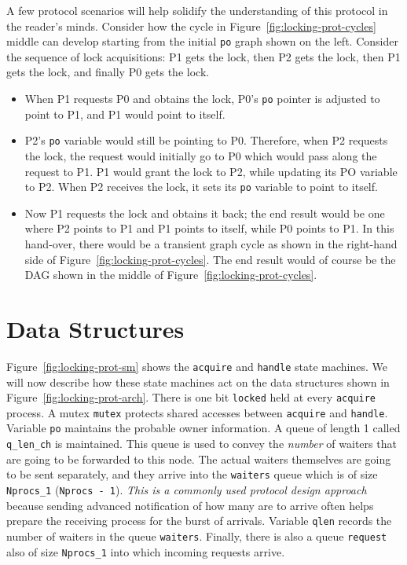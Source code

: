 \documentclass[11pt]{article}
\begin{document}
A few protocol scenarios will help solidify the understanding of
this protocol
in the reader's minds.
%
Consider how the cycle in Figure~\ref{fig:locking-prot-cycles} middle
can develop starting from the initial {\tt po} graph shown on the left.
%
Consider the sequence of lock acquisitions: P1 gets the lock, then P2
gets the lock, then P1 gets the lock, and finally P0 gets the lock.
\begin{itemize}
\item When P1 requests P0 and obtains the lock, P0's {\tt po} pointer
  is adjusted to point to P1, and P1 would point to itself.
\item P2's {\tt po} variable would still be pointing to P0. Therefore,
  when P2 requests the lock, the request would initially go to P0
  which would pass along the request to P1. P1 would grant the lock to P2,
  while updating its PO variable to P2. When P2 receives the lock, it sets
  its {\tt po} variable to point to itself.
\item Now P1 requests the lock and obtains it back; the end result
  would be one where P2 points to P1 and P1 points to itself, while
  P0 points to P1. In this hand-over, there would be a transient
  graph cycle as shown in the right-hand side of
  Figure~\ref{fig:locking-prot-cycles}.
  The end result would of course be the DAG shown in the middle
  of Figure~\ref{fig:locking-prot-cycles}.
\end{itemize}



\section{Data Structures}
\label{sec:ds}
%
Figure~\ref{fig:locking-prot-sm} shows the {\tt acquire} and {\tt handle}
state machines.
%
We will now describe how these state machines act on the data structures
shown in Figure~\ref{fig:locking-prot-arch}.
%
There is one bit {\tt locked} held at every {\tt acquire} process.
%
A mutex {\tt mutex} protects shared accesses between {\tt acquire}
and {\tt handle}.
%
Variable {\tt po} maintains the probable owner information.
%
A queue of length 1 called {\tt q\_len\_ch} is maintained.
%
This queue is used to convey the {\em number} of waiters that are
going to be forwarded to this node.
%
The actual waiters themselves are going to be sent separately, and
they arrive into the {\tt waiters} queue which is of
size {\tt Nprocs\_1} ({\tt Nprocs - 1}).
%
{\em This is a commonly used protocol design approach} because
sending advanced notification of how many are to arrive often
helps prepare the receiving process for the burst of arrivals.
%  
Variable {\tt qlen} records the number of waiters in the
queue {\tt waiters}.
%
Finally, there is also a queue {\tt request} also of
size {\tt Nprocs\_1} into which incoming requests arrive.
\end{document}

